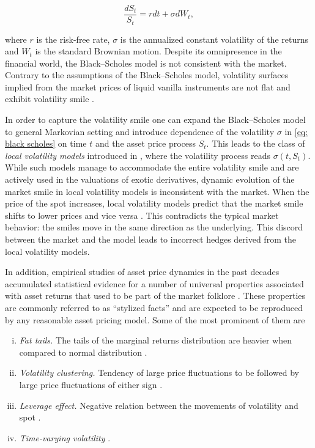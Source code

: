 \documentclass[12pt,twoside]{article}
\theoremstyle{plain}
\theoremstyle{plain}
\theoremstyle{definition}
\theoremstyle{remark}
\numberwithin{equation}{section}
\begin{document}
\begin{equation}
\label{eq: black scholes}
\frac{dS_t}{S_t} = r dt + \sigma dW_t,
\end{equation}

where $r$ is the risk-free rate, $\sigma$ is the annualized constant volatility of the returns and $W_t$ is the standard Brownian motion. Despite its omnipresence in the financial world, the Black–Scholes model is not consistent with the market. Contrary to the assumptions of the Black–Scholes model, volatility surfaces implied from the market prices of liquid vanilla instruments are not flat and exhibit volatility smile \cite{DK94}.

In order to capture the volatility smile one can expand the Black–Scholes model to general Markovian setting and introduce dependence of the volatility $\sigma$ in \eqref{eq: black scholes} on time $t$ and the asset price process $S_t$. This leads to the class of \textit{local volatility models} introduced in \cite{D94}, where the volatility process reads $\sigma(t, S_t)$. While such models manage to accommodate the entire volatility smile and are actively used in the valuations of exotic derivatives, dynamic evolution of the market smile in local volatility models is inconsistent with the market. When the price of the spot increases, local volatility models predict that the market smile shifts to lower prices and vice versa \cite{HKLW02}. This contradicts the typical market behavior: the smiles move in the same direction as the underlying. This discord between the market and the model leads to incorrect hedges derived from the local volatility models.

In addition, empirical studies of asset price dynamics in the past decades accumulated statistical evidence for a number of universal properties associated with asset returns that used to be part of the market folklore \cite{C01}. These properties are commonly referred to as ``stylized facts'' and are expected to be reproduced by any reasonable asset pricing model. Some of the most prominent of them are
\clearpage
\begin{enumerate}[(i)]
    \item \emph{Fat tails.} The tails of the marginal returns distribution are heavier when compared to normal distribution \cite{M67}.
    \item \emph{Volatility clustering.} Tendency of large price fluctuations to be followed by large price fluctuations of either sign \cite{M67}.
    \item \emph{Leverage effect.} Negative relation between the movements of volatility and spot \cite{C82}.
    \item \emph{Time-varying volatility} \cite{C01}.
\end{enumerate}
\end{document}
